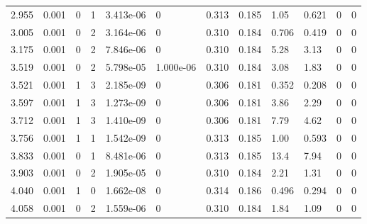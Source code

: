 \documentclass[preview]{standalone}
\begin{document}
{{\begin{tabular}{L{1.2cm}C{1.2cm} C{0.3cm}C{0.5cm} C{1.4cm}C{1.4cm} C{1.4cm}C{1.4cm} C{1.6cm}C{1.6cm} C{1.6cm}C{1.6cm}}
  2.955  &  0.001  & 0     &  1 &  3.413e-06  & 0  &  0.313&   0.185& 1.05 & 0.621   &  0 & 0  \\ 
  3.005  &  0.001  & 0     &  2 &  3.164e-06  & 0  &  0.310&   0.184& 0.706 & 0.419   &  0 & 0  \\ 
  3.175  &  0.001  & 0     &  2 &  7.846e-06  & 0  &  0.310&   0.184& 5.28 & 3.13   &  0 & 0  \\ 
  3.519  &  0.001  & 0     &  2 &  5.798e-05  & 1.000e-06  &  0.310&   0.184& 3.08 & 1.83   &  0 & 0  \\ 
  3.521  &  0.001  & 1     &  3 &  2.185e-09  & 0  &  0.306&   0.181& 0.352 & 0.208   &  0 & 0  \\ 
  3.597  &  0.001  & 1     &  3 &  1.273e-09  & 0  &  0.306&   0.181& 3.86 & 2.29   &  0 & 0  \\ 
  3.712  &  0.001  & 1     &  3 &  1.410e-09  & 0  &  0.306&   0.181& 7.79 & 4.62   &  0 & 0  \\ 
  3.756  &  0.001  & 1     &  1 &  1.542e-09  & 0  &  0.313&   0.185& 1.00 & 0.593   &  0 & 0  \\ 
  3.833  &  0.001  & 0     &  1 &  8.481e-06  & 0  &  0.313&   0.185& 13.4 & 7.94   &  0 & 0  \\ 
  3.903  &  0.001  & 0     &  2 &  1.905e-05  & 0  &  0.310&   0.184& 2.21 & 1.31   &  0 & 0  \\ 
  4.040  &  0.001  & 1     &  0 &  1.662e-08  & 0  &  0.314&   0.186& 0.496 & 0.294   &  0 & 0  \\ 
  4.058  &  0.001  & 0     &  2 &  1.559e-06  & 0  &  0.310&   0.184& 1.84 & 1.09   &  0 & 0  \\ 
\hline 
\end{tabular} 

}}
\end{document}

